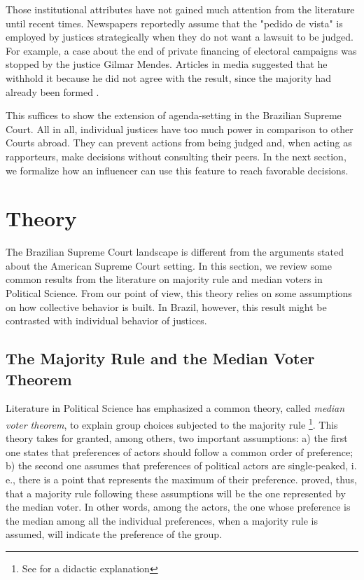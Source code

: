 \documentclass[12pt, a4paper]{article}
\begin{document}
\begin{enumerate}
Those institutional attributes have not gained much attention from the literature until recent times. Newspapers reportedly assume that the "pedido de vista" is employed by justices strategically when they do not want a lawsuit to be judged. For example, a case about the end of private financing of electoral campaigns was stopped by the justice Gilmar Mendes. Articles in media suggested that he withhold it because he did not agree with the result, since the majority had already been formed \citep{pedidodevistagilmar}.

\end{enumerate}

This suffices to show the extension of agenda-setting in the Brazilian Supreme Court. All in all, individual justices have too much power in comparison to other Courts abroad. They can prevent actions from being judged and, when acting as rapporteurs, make decisions without consulting their peers. In the next section, we formalize how an influencer can use this feature to reach favorable decisions. 




\section{Theory}
\label{theory}

The Brazilian Supreme Court landscape is different from the arguments stated about the American Supreme Court setting. In this section, we review some common results from the literature on majority rule and median voters in Political Science. From our point of view, this theory relies on some assumptions on
how collective behavior is built. In Brazil, however, this result might be contrasted with individual behavior of justices.

\subsection{The Majority Rule and the Median Voter Theorem}

Literature in Political Science has emphasized a common theory, called \emph{median voter theorem}, to explain group choices subjected to the majority rule \citep{black1948rationale}\footnote{See \citet{shepsle1996analyzing} for a didactic explanation}. This theory takes for granted, among others, two important assumptions: a) the first one states that preferences of
actors should follow a common order of preference; b) the second one assumes that preferences of political actors are single-peaked, i. e., there is a point that represents the maximum of their preference. \citet{black1948rationale}
proved, thus, that a majority rule following these assumptions will be the one represented by the median voter. In other words, among the actors, the one whose preference is the median among all the individual preferences, when a majority rule is assumed, will indicate the preference of the group.
\end{document}
